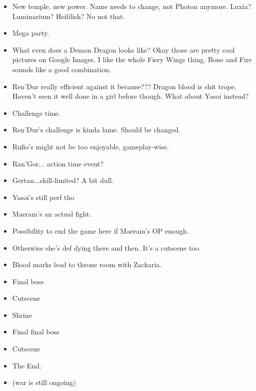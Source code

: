 \documentclass[a4paper,12pt]{book}
\begin{document}
\begin{itemize}
				\item New temple, new power. Name needs to change, not Photon anymore. Luxia? Luminarium? Heililish? No not that.
				\item Mega party.
				\item What even does a Demon Dragon looks like? Okay those are pretty cool pictures on Google Images. I like the whole Fiery Wings thing. Bone and Fire sounds like a good combination.
				\item Ren'Dur really efficient against it because??? Dragon blood is shit trope. Haven't seen it well done in a girl before though. What about Yasoi instead?
				\item Challenge time.
				\item Ren'Dur's challenge is kinda lame. Should be changed.
				\item Rufio's might not be too enjoyable, gameplay-wise.
				\item Ran'Gor... action time event?
				\item Gertan...skill-limited? A bit dull.
				\item Yasoi's still perf tho
				\item Maeram's an actual fight.
				\item Possibility to end the game here if Maeram's OP enough.
				\item Otherwise she's def dying there and then. It's a cutscene too.
				\item Blood marks lead to throne room with Zackaria.
				\item Final boss
				\item Cutscene
				\item Shrine
				\item Final final boss
				\item Cutscene
				\item The End.
				\item (war is still ongoing)
				\end{itemize}
\end{document}
